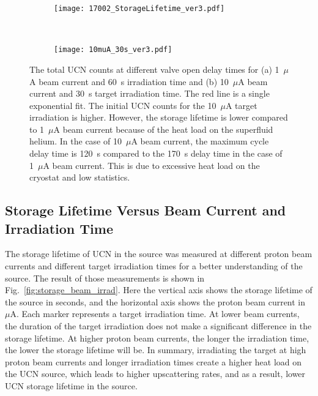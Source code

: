 \begin{figure}[h!]
  \centering
  \begin{subfigure}{.8\textwidth}
    \centering
    \texttt{[image: 17002\_StorageLifetime\_ver3.pdf]}
    \caption{}
    \label{fig:storage_example1}
  \end{subfigure}%
  \\
  \begin{subfigure}{.8\textwidth}
    \centering
    \texttt{[image: 10muA\_30s\_ver3.pdf]}
    \caption{}
    \label{fig:storage_example10}
  \end{subfigure}
  \caption[UCN storage lifetime extraction for two beam currents]{The
    total UCN counts at different valve open delay times for (a)
    1~$\mu$A beam current and 60~s irradiation time and (b) 10~$\mu$A
    beam current and 30~s target irradiation time. The red line is a
    single exponential fit. The initial UCN counts for the 10~$\mu$A
    target irradiation is higher. However, the storage lifetime is
    lower compared to 1~$\mu$A beam current because of the heat load
    on the superfluid helium. In the case of 10~$\mu$A beam current,
    the maximum cycle delay time is 120~s compared to the 170~s delay
    time in the case of 1~$\mu$A beam current. This is due to
    excessive heat load on the cryostat and low statistics.}
  \label{fig:storage_example}
\end{figure}


\subsection{Storage Lifetime Versus Beam Current and Irradiation Time}
The storage lifetime of UCN in the source was measured at different
proton beam currents and different target irradiation times for a
better understanding of the source. The result of those measurements
is shown in Fig.~\ref{fig:storage_beam_irrad}. Here the vertical axis
shows the storage lifetime of the source in seconds, and the
horizontal axis shows the proton beam current in $\mu$A. Each marker
represents a target irradiation time. At lower beam currents, the
duration of the target irradiation does not make a significant
difference in the storage lifetime. At higher proton beam currents,
the longer the irradiation time, the lower the storage lifetime will
be. In summary, irradiating the target at high proton beam currents
and longer irradiation times create a higher heat load on the UCN
source, which leads to higher upscattering rates, and as a result,
lower UCN storage lifetime in the source.

